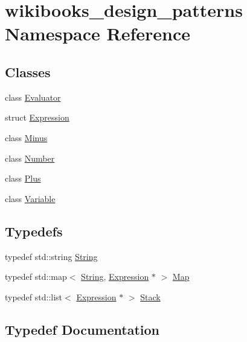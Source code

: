 \hypertarget{namespacewikibooks__design__patterns}{}\section{wikibooks\+\_\+design\+\_\+patterns Namespace Reference}
\label{namespacewikibooks__design__patterns}
\subsection*{Classes}
\begin{DoxyCompactItemize}
\item 
class \hyperlink{classwikibooks__design__patterns_1_1Evaluator}{Evaluator}
\item 
struct \hyperlink{structwikibooks__design__patterns_1_1Expression}{Expression}
\item 
class \hyperlink{classwikibooks__design__patterns_1_1Minus}{Minus}
\item 
class \hyperlink{classwikibooks__design__patterns_1_1Number}{Number}
\item 
class \hyperlink{classwikibooks__design__patterns_1_1Plus}{Plus}
\item 
class \hyperlink{classwikibooks__design__patterns_1_1Variable}{Variable}
\end{DoxyCompactItemize}
\subsection*{Typedefs}
\begin{DoxyCompactItemize}
\item 
typedef std\+::string \hyperlink{namespacewikibooks__design__patterns_a603d2591ea56686888d0e4389481a453}{String}
\item 
typedef std\+::map$<$ \hyperlink{namespacewikibooks__design__patterns_a603d2591ea56686888d0e4389481a453}{String}, \hyperlink{structwikibooks__design__patterns_1_1Expression}{Expression} $\ast$ $>$ \hyperlink{namespacewikibooks__design__patterns_adf1889a865861dea765d8a115cc66ae9}{Map}
\item 
typedef std\+::list$<$ \hyperlink{structwikibooks__design__patterns_1_1Expression}{Expression} $\ast$ $>$ \hyperlink{namespacewikibooks__design__patterns_a3247979de240b19de03793d4ec6ede0e}{Stack}
\end{DoxyCompactItemize}


\subsection{Typedef Documentation}
